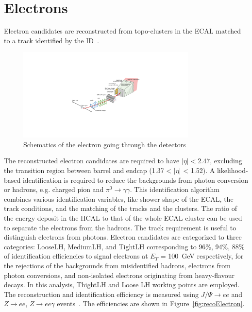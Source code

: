 \section{Electrons}
Electron candidates are reconstructed from topo-clusters in the ECAL matched to a track identified by the ID~\cite{ATL-PHYS-PUB-2017-022}.
\begin{figure}[tbp]
\begin{center}
 \includegraphics[width=0.80\textwidth,keepaspectratio]{figures/Reconstruction/electronPath}
\caption{
Schematics of the electron going through the detectors
}
\label{fig:electronPath}
\end{center}
\end{figure}
The reconstructed electron candidates are required to have $|\eta|<2.47$, excluding the transition region between barrel and endcap (1.37 < $|\eta|$ < 1.52).
A likelihood-based identification is required to reduce the backgrounds from photon conversion or hadrons, e.g. charged pion and $\pi^0 \rightarrow \gamma \gamma$. 
This identification algorithm combines various identification variables, like shower shape of the ECAL, the track conditions, and the matching of the tracks and the clusters. 
The ratio of the energy deposit in the HCAL to that of the whole ECAL cluster can be used to separate the electrons from the hadrons. 
The track requirement is useful to distinguish electrons from photons.
Electron candidates are categorized to three categories: LooseLH, MediumLH, and TightLH corresponding to 96\%, 94\%, 88\% of identification efficiencies to signal electrons at $E_T$ = 100~GeV respectively, for the rejections of the backgrounds from misidentified hadrons, electrons from photon conversions, and non-isolated electrons originating from heavy-flavour decays. 
In this analysis, ThightLH and Loose LH working points are employed.
The reconstruction and identification efficiency is measured using  $J/\Psi \rightarrow ee$ and $Z\rightarrow ee$, $Z\rightarrow ee\gamma$ events~\cite{PERF-2017-01}. The efficiencies are shown in Figure~\ref{fig:recoElectron}. 
